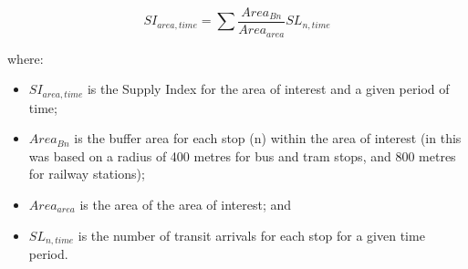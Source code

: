 \documentclass[preprint, 3p,
authoryear]{elsarticle} %
\begin{document}
\[SI_{area, time} = \sum{\frac{Area_{Bn}}{Area_{area}}SL_{n, time}}\]

where:

\begin{itemize}
\item
  \(SI_{area, time}\) is the Supply Index for the area of interest and a
  given period of time;
\item
  \(Area_{Bn}\) is the buffer area for each stop (n) within the area of
  interest (in \citet{currie2010identifying} this was based on a radius
  of 400 metres for bus and tram stops, and 800 metres for railway
  stations);
\item
  \(Area_{area}\) is the area of the area of interest; and
\item
  \(SL_{n,time}\) is the number of transit arrivals for each stop for a
  given time period.
\end{itemize}
\end{document}
